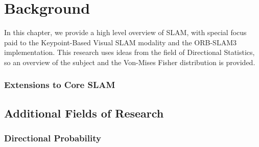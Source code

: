 \section{Background}
\label{background}

In this chapter, we provide a high level overview of SLAM, with special focus paid to the Keypoint-Based Visual SLAM modality and the ORB-SLAM3 implementation. This research uses ideas from the field of Directional Statistics, so an overview of the subject and the Von-Mises Fisher distribution is provided.



\subsubsection{Extensions to Core SLAM}

\subsection{Additional Fields of Research}

\subsubsection{Directional Probability}